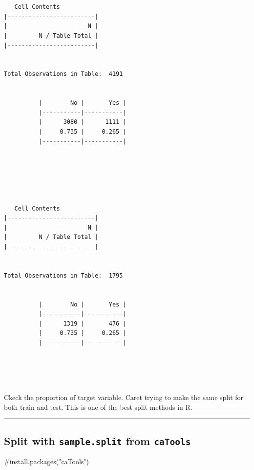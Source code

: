 \documentclass[
  letterpaper,
  DIV=11,
  numbers=noendperiod]{scrreprt}
\newenvironment{Shaded}{\begin{snugshade}}{\end{snugshade}}
\newcommand{\AttributeTok}[1]{\textcolor[rgb]{0.40,0.45,0.13}{#1}}
\newcommand{\CommentTok}[1]{\textcolor[rgb]{0.37,0.37,0.37}{#1}}
\newcommand{\DecValTok}[1]{\textcolor[rgb]{0.68,0.00,0.00}{#1}}
\newcommand{\FunctionTok}[1]{\textcolor[rgb]{0.28,0.35,0.67}{#1}}
\newcommand{\NormalTok}[1]{\textcolor[rgb]{0.00,0.23,0.31}{#1}}
\newcommand{\OtherTok}[1]{\textcolor[rgb]{0.00,0.23,0.31}{#1}}
\newcommand{\SpecialCharTok}[1]{\textcolor[rgb]{0.37,0.37,0.37}{#1}}
\begin{document}
\begin{verbatim}

 
   Cell Contents
|-------------------------|
|                       N |
|         N / Table Total |
|-------------------------|

 
Total Observations in Table:  4191 

 
          |        No |       Yes | 
          |-----------|-----------|
          |      3080 |      1111 | 
          |     0.735 |     0.265 | 
          |-----------|-----------|



 

 
   Cell Contents
|-------------------------|
|                       N |
|         N / Table Total |
|-------------------------|

 
Total Observations in Table:  1795 

 
          |        No |       Yes | 
          |-----------|-----------|
          |      1319 |       476 | 
          |     0.735 |     0.265 | 
          |-----------|-----------|



 
\end{verbatim}

Ckeck the proportion of target variable. Caret trying to make the same
split for both train and test. This is one of the best split methods in
R.

\begin{center}\rule{0.5\linewidth}{0.5pt}\end{center}

\subsection{\texorpdfstring{Split with \texttt{sample.split} from
\texttt{caTools}}{Split with sample.split from caTools}}\label{split-with-sample.split-from-catools}

\begin{Shaded}
\begin{Highlighting}[]
\CommentTok{\#install.packages("caTools")}
\end{Highlighting}
\end{Shaded}

\begin{Shaded}
\end{Shaded}
\end{document}
